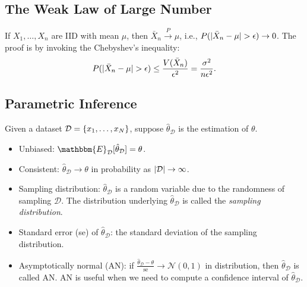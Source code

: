     \subsection{The Weak Law of Large Number}
        If $X_1, \ldots, X_n$ are IID with mean $\mu$, then $\bar{X}_n \xrightarrow{P} \mu$, i.e., $P(| \bar{X}_n - \mu | > \epsilon) \rightarrow 0$.
        The proof is by invoking the Chebyshev's inequality:
            \begin{equation}
                P(| \bar{X}_n - \mu | > \epsilon) \le \frac{V(\bar{X}_n)}{\epsilon^2} = \frac{ \sigma^2 }{n \epsilon^2}.
            \end{equation}
     
     

\subsection{Parametric Inference}
    Given a dataset $\mathcal{D} = \{ x_1, \ldots, x_N \}$, suppose $\hat{\theta}_{\mathcal{D}}$ is the estimation of $\theta$.
    \begin{itemize}
        \item Unbiased: $\mathbbm{E}_{\mathcal{D}}[\hat{\theta}_\mathcal{D} ] = \theta$.
        \item Consistent: $\hat{\theta}_\mathcal{D} \rightarrow \theta$ in probability as $| \mathcal{D} | \rightarrow \infty$.
        \item Sampling distribution: $\hat{\theta}_\mathcal{D}$ is a random variable due to the randomness of sampling $\mathcal{D}$.
        The distribution underlying $\hat{\theta}_\mathcal{D}$ is called the \emph{sampling distribution}.
        \item Standard error (se) of $\hat{\theta}_\mathcal{D}$: the standard deviation of the sampling distribution.
        \item Asymptotically normal (AN): if $\frac{\hat{\theta}_\mathcal{D} - \theta}{\text{se}} \rightarrow \mathcal{N}(0, 1)$ in distribution, then $\hat{\theta}_\mathcal{D}$ is called AN.
        AN is useful when we need to compute a confidence interval of $\hat{\theta}_\mathcal{D}$.
    \end{itemize}

